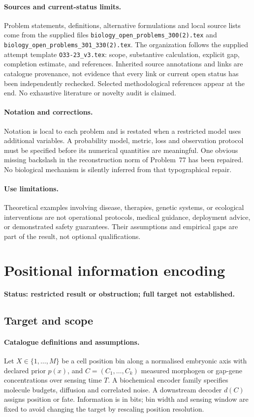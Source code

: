 \documentclass[11pt]{article}
\begin{document}
\paragraph{Sources and current-status limits.}
Problem statements, definitions, alternative formulations and local source lists
come from the supplied files
\texttt{biology\_open\_problems\_300(2).tex} and
\texttt{biology\_open\_problems\_301\_330(2).tex}.
The organization follows the supplied attempt template
\texttt{O33-23\_v3.tex}: scope, substantive calculation, explicit gap,
completion estimate, and references. Inherited source annotations and links are
catalogue provenance, not evidence that every link or current open status has
been independently rechecked. Selected methodological references appear at the
end. No exhaustive literature or novelty audit is claimed.

\paragraph{Notation and corrections.}
Notation is local to each problem and is restated when a restricted model uses
additional variables. A probability model, metric, loss and observation protocol
must be specified before its numerical quantities are meaningful. One obvious
missing backslash in the reconstruction norm of Problem~77 has been repaired.
No biological mechanism is silently inferred from that typographical repair.

\paragraph{Use limitations.}
Theoretical examples involving disease, therapies, genetic systems, or ecological
interventions are not operational protocols, medical guidance, deployment advice,
or demonstrated safety guarantees. Their assumptions and empirical gaps are part
of the result, not optional qualifications.


\section*{Positional information encoding}
\label{prob:131}
\noindent\textbf{Status: restricted result or obstruction; full target not established.}
\subsection{Target and scope}
\paragraph{Catalogue definitions and assumptions.}
Let $X\in\{1,\ldots,M\}$ be a cell position bin along a normalised embryonic axis with declared prior $p(x)$, and $C=(C_1,\ldots,C_k)$ measured morphogen or gap-gene concentrations over sensing time $T$. A biochemical encoder family specifies molecule budgets, diffusion and correlated noise. A downstream decoder $d(C)$ assigns position or fate. Information is in bits; bin width and sensing window are fixed to avoid changing the target by rescaling position resolution.
\end{document}

